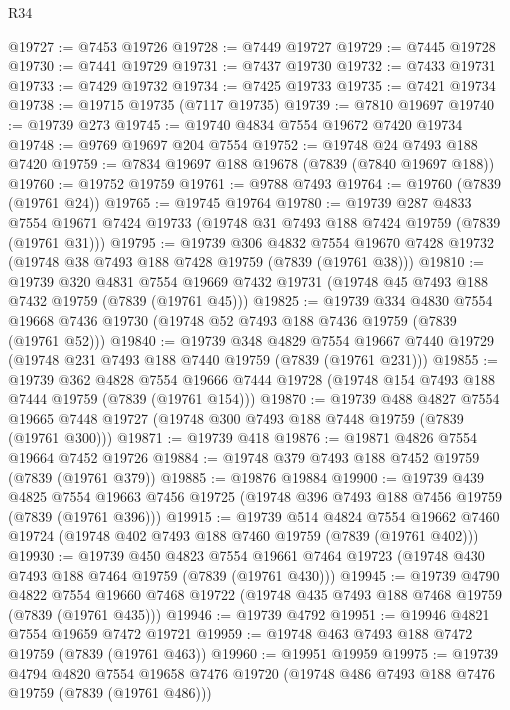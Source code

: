 \begin{lexlean}{R34}
\begin{coremodule}
@19727 := @7453 @19726
@19728 := @7449 @19727
@19729 := @7445 @19728
@19730 := @7441 @19729
@19731 := @7437 @19730
@19732 := @7433 @19731
@19733 := @7429 @19732
@19734 := @7425 @19733
@19735 := @7421 @19734
@19738 := @19715 @19735 (@7117 @19735)
@19739 := @7810 @19697
@19740 := @19739 @273
@19745 := @19740 @4834 @7554 @19672 @7420 @19734
@19748 := @9769 @19697 @204 @7554
@19752 := @19748 @24 @7493 @188 @7420
@19759 := @7834 @19697 @188 @19678 (@7839 (@7840 @19697 @188))
@19760 := @19752 @19759
@19761 := @9788 @7493
@19764 := @19760 (@7839 (@19761 @24))
@19765 := @19745 @19764
@19780 := @19739
    @287
    @4833
    @7554
    @19671
    @7424
    @19733
    (@19748 @31 @7493 @188 @7424 @19759 (@7839 (@19761 @31)))
@19795 := @19739
    @306
    @4832
    @7554
    @19670
    @7428
    @19732
    (@19748 @38 @7493 @188 @7428 @19759 (@7839 (@19761 @38)))
@19810 := @19739
    @320
    @4831
    @7554
    @19669
    @7432
    @19731
    (@19748 @45 @7493 @188 @7432 @19759 (@7839 (@19761 @45)))
@19825 := @19739
    @334
    @4830
    @7554
    @19668
    @7436
    @19730
    (@19748 @52 @7493 @188 @7436 @19759 (@7839 (@19761 @52)))
@19840 := @19739
    @348
    @4829
    @7554
    @19667
    @7440
    @19729
    (@19748 @231 @7493 @188 @7440 @19759 (@7839 (@19761 @231)))
@19855 := @19739
    @362
    @4828
    @7554
    @19666
    @7444
    @19728
    (@19748 @154 @7493 @188 @7444 @19759 (@7839 (@19761 @154)))
@19870 := @19739
    @488
    @4827
    @7554
    @19665
    @7448
    @19727
    (@19748 @300 @7493 @188 @7448 @19759 (@7839 (@19761 @300)))
@19871 := @19739 @418
@19876 := @19871 @4826 @7554 @19664 @7452 @19726
@19884 := @19748 @379 @7493 @188 @7452 @19759 (@7839 (@19761 @379))
@19885 := @19876 @19884
@19900 := @19739
    @439
    @4825
    @7554
    @19663
    @7456
    @19725
    (@19748 @396 @7493 @188 @7456 @19759 (@7839 (@19761 @396)))
@19915 := @19739
    @514
    @4824
    @7554
    @19662
    @7460
    @19724
    (@19748 @402 @7493 @188 @7460 @19759 (@7839 (@19761 @402)))
@19930 := @19739
    @450
    @4823
    @7554
    @19661
    @7464
    @19723
    (@19748 @430 @7493 @188 @7464 @19759 (@7839 (@19761 @430)))
@19945 := @19739
    @4790
    @4822
    @7554
    @19660
    @7468
    @19722
    (@19748 @435 @7493 @188 @7468 @19759 (@7839 (@19761 @435)))
@19946 := @19739 @4792
@19951 := @19946 @4821 @7554 @19659 @7472 @19721
@19959 := @19748 @463 @7493 @188 @7472 @19759 (@7839 (@19761 @463))
@19960 := @19951 @19959
@19975 := @19739
    @4794
    @4820
    @7554
    @19658
    @7476
    @19720
    (@19748 @486 @7493 @188 @7476 @19759 (@7839 (@19761 @486)))

\end{coremodule}
\end{lexlean}
